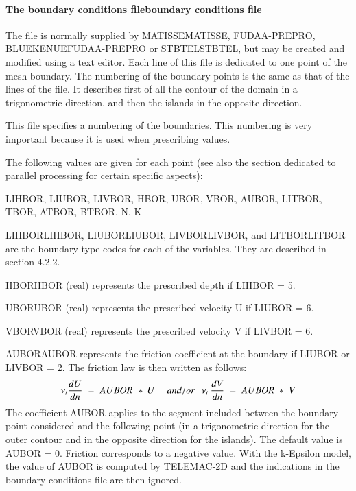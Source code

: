 \documentclass{article} %
\begin{document}
\paragraph{ The boundary conditions fileboundary conditions file}

 The file is normally supplied by MATISSEMATISSE, FUDAA-PREPRO, BLUEKENUEFUDAA-PREPRO or STBTELSTBTEL, but may be created and modified using a text editor. Each line of this file is dedicated to one point of the mesh boundary. The numbering of the boundary points is the same as that of the lines of the file. It describes first of all the contour of the domain in a trigonometric direction, and then the islands in the opposite direction.

 This file specifies a numbering of the boundaries. This numbering is very important because it is used when prescribing values.

 The following values are given for each point (see also the section dedicated to parallel processing for certain specific aspects):

 LIHBOR, LIUBOR, LIVBOR, HBOR, UBOR, VBOR, AUBOR, LITBOR, TBOR, ATBOR, BTBOR, N, K

 LIHBORLIHBOR, LIUBORLIUBOR, LIVBORLIVBOR, and LITBORLITBOR are the boundary type codes for each of the variables. They are described in section 4.2.2.

 HBORHBOR (real) represents the prescribed depth if LIHBOR = 5.

 UBORUBOR (real) represents the prescribed velocity U if LIUBOR = 6.

 VBORVBOR (real) represents the prescribed velocity V if LIVBOR = 6.

 AUBORAUBOR  represents the friction coefficient at the boundary if LIUBOR or LIVBOR = 2. The friction law is then written as follows:
\[\nu _{t} \frac{dU}{dn} {\kern 1pt} {\kern 1pt} {\kern 1pt} ={\kern 1pt} {\kern 1pt} {\kern 1pt} AUBOR{\kern 1pt} {\kern 1pt} {\kern 1pt} {\kern 1pt} *{\kern 1pt} {\kern 1pt} U{\kern 1pt} {\kern 1pt} {\kern 1pt} {\kern 1pt} {\kern 1pt} {\kern 1pt} {\kern 1pt} {\kern 1pt} {\kern 1pt} {\kern 1pt} {\kern 1pt} {\kern 1pt} {\kern 1pt} and/or{\kern 1pt} {\kern 1pt} {\kern 1pt} {\kern 1pt} {\kern 1pt} {\kern 1pt} {\kern 1pt} \nu _{t} {\kern 1pt} {\kern 1pt} \frac{dV}{dn} {\kern 1pt} {\kern 1pt} {\kern 1pt} ={\kern 1pt} {\kern 1pt} {\kern 1pt} AUBOR{\kern 1pt} {\kern 1pt} {\kern 1pt} *{\kern 1pt} {\kern 1pt} {\kern 1pt} V\]
The coefficient AUBOR applies to the segment included between the boundary point considered and the following point (in a trigonometric direction for the outer contour and in the opposite direction for the islands). The default value is AUBOR = 0. Friction corresponds to a negative value. With the k-Epsilon model, the value of AUBOR is computed by TELEMAC-2D and the indications in the boundary conditions file are then ignored.
\end{document}
